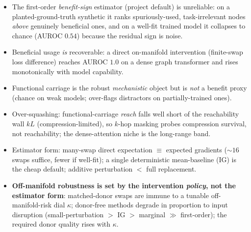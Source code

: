 
\begin{itemize}\itemsep=2pt
  \item The first-order \emph{benefit-sign} estimator (project default) is unreliable: on
        a planted-ground-truth synthetic it ranks spuriously-used, task-irrelevant nodes
        \emph{above} genuinely beneficial ones, and on a well-fit trained model it collapses
        to chance (AUROC $0.54$) because the residual sign is noise.
  \item Beneficial usage \emph{is} recoverable: a direct on-manifold intervention
        (finite-swap loss difference) reaches AUROC $1.0$ on a dense graph transformer and
        rises monotonically with model capability.
  \item Functional carriage is the robust \emph{mechanistic} object but is \emph{not} a
        benefit proxy (chance on weak models; over-flags distractors on partially-trained ones).
  \item Over-squashing: functional-carriage \emph{reach} falls well short of the reachability
        wall $kL$ (compression-limited), so $k$-hop masking probes compression survival, not
        reachability; the dense-attention niche is the long-range band.
  \item Estimator form: many-swap direct expectation $\equiv$ expected gradients ($\sim\!16$
        swaps suffice, fewer if well-fit); a single deterministic mean-baseline (IG) is the
        cheap default; additive perturbation $<$ full replacement.
  \item \textbf{Off-manifold robustness is set by the intervention \emph{policy}, not the
        estimator form}: matched-donor swaps are immune to a tunable off-manifold-risk dial
        $\kappa$; donor-free methods degrade in proportion to input disruption
        (small-perturbation $>$ IG $>$ marginal $\gg$ first-order); the required donor quality
        rises with $\kappa$.
\end{itemize}

